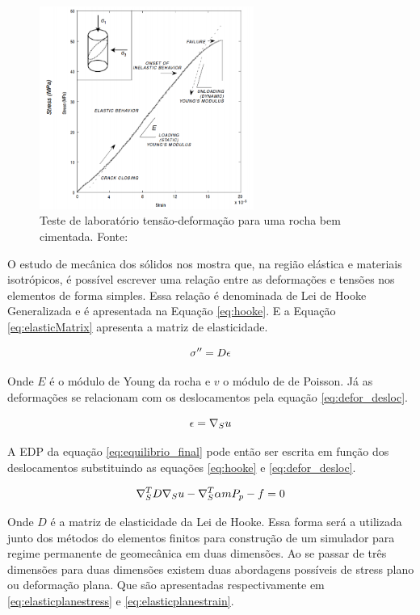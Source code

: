 \begin{figure}[!htbp]
\centering
\includegraphics[width=7cm]{chap01/stress_strain.PNG}
\caption{Teste de laboratório tensão-deformação para uma rocha bem cimentada. Fonte: \cite{ResGeomec}}
\label{fig:stress_strain}
\end{figure}


O estudo de mecânica dos sólidos nos mostra que, na região elástica e materiais isotrópicos, é possível escrever uma relação entre as deformações e tensões nos elementos de forma simples. Essa relação é denominada de Lei de Hooke Generalizada e é apresentada na Equação \eqref{eq:hooke}. E a Equação \eqref{eq:elasticMatrix} apresenta a matriz de elasticidade.


\begin{equation}{
\label{eq:hooke}
\fontsize{4}{4}\selectfont
\sigma ^{\prime\prime}= D \epsilon
}
\end{equation}



Onde $E$ é o módulo de Young da rocha e $v$ o módulo de de Poisson. Já as deformações se relacionam com os deslocamentos pela equação \eqref{eq:defor_desloc}.

\begin{equation}
\label{eq:defor_desloc}
\epsilon = \nabla_S u
\end{equation}


A EDP da equação \eqref{eq:equilibrio_final} pode então ser escrita em função dos deslocamentos substituindo as equações \eqref{eq:hooke} e \eqref{eq:defor_desloc}.

\begin{equation}
\label{eq:edp_geomec}
\nabla_S^TD \nabla_S u - \nabla_S^T\alpha m P_p - f = 0
\end{equation}

Onde $D$ é a matriz de elasticidade da Lei de Hooke. Essa forma será a utilizada junto dos métodos do elementos finitos para construção de um simulador para regime permanente de geomecânica em duas dimensões. Ao se passar
de três dimensões para duas dimensões existem duas abordagens possíveis de stress plano ou deformação plana. Que são apresentadas respectivamente em \eqref{eq:elasticplanestress} e \eqref{eq:elasticplanestrain}.

